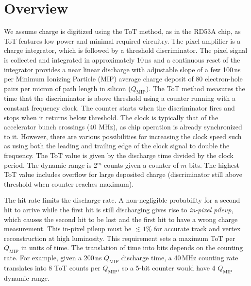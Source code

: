 \documentclass[12pt]{article}
\begin{document}
\section{Overview}
\label{sec:tot}

We assume charge is digitized using the ToT method, as in the RD53A chip, as ToT features 
low power and minimal required circuitry. The pixel amplifier is a charge integrator, which is followed by 
a threshold discriminator. The pixel signal is collected and integrated in approximately 10\,ns and 
a continuous reset of the integrator provides a near linear discharge with adjustable slope of a few 100\,ns per 
Minimum Ionizing Particle (MIP) average charge deposit of 80 electron-hole pairs per micron of path length in silicon ($Q_\text{MIP}$). 
The ToT method measures the time that the discriminator is above threshold using a counter running with a constant frequency clock. The counter starts when the discriminator fires and stops when it returns below threshold. 
The clock is typically that of the accelerator bunch crossings (40 MHz), as chip operation is already synchronized to it.  However, there are various possibilities for increasing the clock speed such as using both the leading and trailing edge of the clock signal to double the frequency.   The ToT value is given 
by the discharge time divided by the clock period. The dynamic range is 2$^m$ counts given a counter of $m$ bits. 
The highest ToT value includes overflow for large deposited charge (discriminator still above threshold when counter 
reaches maximum).  

The hit rate limits the discharge rate.
A non-negligible probability for a second hit to arrive while the first hit is still discharging
gives rise to \textit{in-pixel pileup}, which causes the second hit to be lost and the first hit to 
have a wrong charge measurement. 
This in-pixel pileup must be $\lesssim 1\%$ for accurate track and vertex reconstruction at high luminosity. 
This requirement sets a maximum ToT per $Q_\text{MIP}$ in units of time. The translation of time into bits depends 
on the counting rate. For example, given a 200\,ns $Q_\text{MIP}$ discharge time, a 40\,MHz counting rate translates into 
8 ToT counts per $Q_\text{MIP}$, so a 5-bit counter would have 4 $Q_\text{MIP}$ dynamic range.
\end{document}

